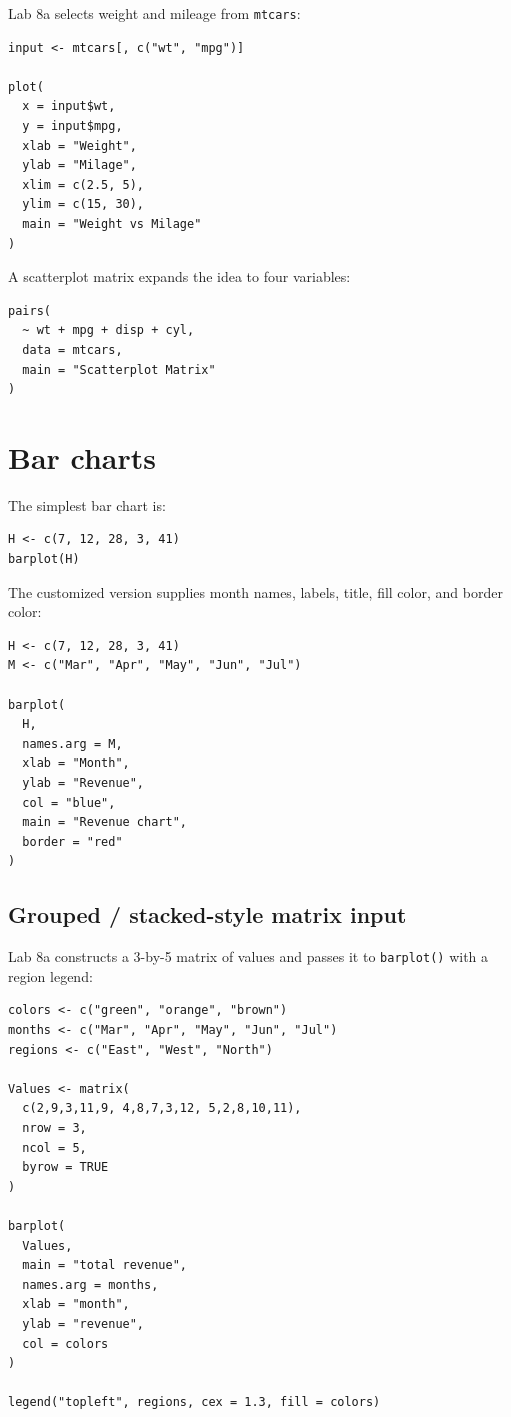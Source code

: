 Lab 8a selects weight and mileage from \texttt{mtcars}:

\begin{lstlisting}[style=dsr]
input <- mtcars[, c("wt", "mpg")]

plot(
  x = input$wt,
  y = input$mpg,
  xlab = "Weight",
  ylab = "Milage",
  xlim = c(2.5, 5),
  ylim = c(15, 30),
  main = "Weight vs Milage"
)
\end{lstlisting}

A scatterplot matrix expands the idea to four variables:

\begin{lstlisting}[style=dsr]
pairs(
  ~ wt + mpg + disp + cyl,
  data = mtcars,
  main = "Scatterplot Matrix"
)
\end{lstlisting}

\section{Bar charts}

The simplest bar chart is:

\begin{lstlisting}[style=dsr]
H <- c(7, 12, 28, 3, 41)
barplot(H)
\end{lstlisting}

The customized version supplies month names, labels, title, fill color, and border color:

\begin{lstlisting}[style=dsr]
H <- c(7, 12, 28, 3, 41)
M <- c("Mar", "Apr", "May", "Jun", "Jul")

barplot(
  H,
  names.arg = M,
  xlab = "Month",
  ylab = "Revenue",
  col = "blue",
  main = "Revenue chart",
  border = "red"
)
\end{lstlisting}

\subsection{Grouped / stacked-style matrix input}

Lab 8a constructs a 3-by-5 matrix of values and passes it to \texttt{barplot()} with a region legend:

\begin{lstlisting}[style=dsr]
colors <- c("green", "orange", "brown")
months <- c("Mar", "Apr", "May", "Jun", "Jul")
regions <- c("East", "West", "North")

Values <- matrix(
  c(2,9,3,11,9, 4,8,7,3,12, 5,2,8,10,11),
  nrow = 3,
  ncol = 5,
  byrow = TRUE
)

barplot(
  Values,
  main = "total revenue",
  names.arg = months,
  xlab = "month",
  ylab = "revenue",
  col = colors
)

legend("topleft", regions, cex = 1.3, fill = colors)
\end{lstlisting}

